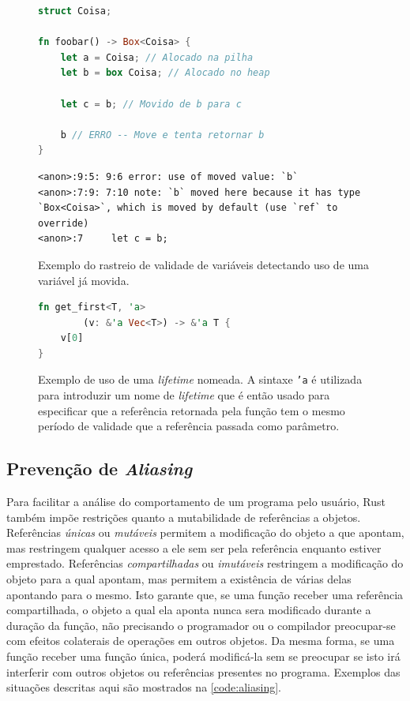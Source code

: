 \documentclass[tg]{mdtufsm}
\begin{document}
\begin{figure}
	\centering
	\begin{minipage}[c]{0.45\textwidth}
		\begin{lstlisting}[language=Rust]
struct Coisa;

fn foobar() -> Box<Coisa> {
	let a = Coisa; // Alocado na pilha
	let b = box Coisa; // Alocado no heap

	let c = b; // Movido de b para c

	b // ERRO -- Move e tenta retornar b
}
		\end{lstlisting}
		\begin{lstlisting}[numbers=none, breaklines=true]
<anon>:9:5: 9:6 error: use of moved value: `b`
<anon>:7:9: 7:10 note: `b` moved here because it has type `Box<Coisa>`, which is moved by default (use `ref` to override)
<anon>:7     let c = b;
		\end{lstlisting}
		\caption{
			Exemplo do rastreio de validade de variáveis detectando uso de uma variável já movida.
		}
		\label{code:moving-vars}
	\end{minipage}%
	\hspace{2em}%
	\begin{minipage}[c]{0.45\textwidth}
		\begin{lstlisting}[language=Rust]
fn get_first<T, 'a>
		(v: &'a Vec<T>) -> &'a T {
	v[0]
}
		\end{lstlisting}
		\caption[Exemplo de uso de uma \emph{lifetime} nomeada.]{
			Exemplo de uso de uma \emph{lifetime} nomeada. A sintaxe \texttt{'a} é utilizada para introduzir um nome de \emph{lifetime} que é então usado para especificar que a referência retornada pela função tem o mesmo período de validade que a referência passada como parâmetro.
		}
		\label{code:named-lifetime}
	\end{minipage}
\end{figure}

\subsection{Prevenção de \emph{Aliasing}} \label{sect:aliasing}

Para facilitar a análise do comportamento de um programa pelo usuário, Rust também impõe restrições quanto a mutabilidade de referências a objetos. Referências \emph{únicas} ou \emph{mutáveis} permitem a modificação do objeto a que apontam, mas restringem qualquer acesso a ele sem ser pela referência enquanto estiver emprestado. Referências \emph{compartilhadas} ou \emph{imutáveis} restringem a modificação do objeto para a qual apontam, mas permitem a existência de várias delas apontando para o mesmo. Isto garante que, se uma função receber uma referência compartilhada, o objeto a qual ela aponta nunca sera modificado durante a duração da função, não precisando o programador ou o compilador preocupar-se com efeitos colaterais de operações em outros objetos. Da mesma forma, se uma função receber uma função única, poderá modificá-la sem se preocupar se isto irá interferir com outros objetos ou referências presentes no programa. Exemplos das situações descritas aqui são mostrados na \autoref{code:aliasing}.
\end{document}
